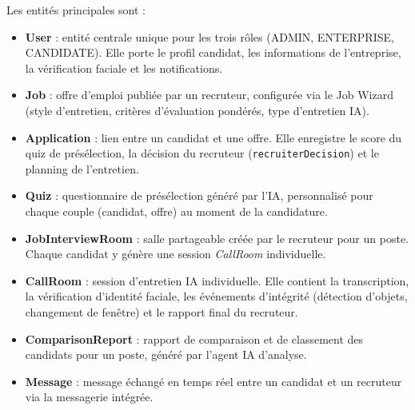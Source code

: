 Les entités principales sont :

\begin{itemize}
  \item \textbf{User} : entité centrale unique pour les trois rôles (ADMIN, ENTERPRISE,
        CANDIDATE). Elle porte le profil candidat, les informations de l'entreprise, la
        vérification faciale et les notifications.
  \item \textbf{Job} : offre d'emploi publiée par un recruteur, configurée via le Job Wizard
        (style d'entretien, critères d'évaluation pondérés, type d'entretien IA).
  \item \textbf{Application} : lien entre un candidat et une offre. Elle enregistre le score
        du quiz de présélection, la décision du recruteur (\texttt{recruiterDecision}) et le
        planning de l'entretien.
  \item \textbf{Quiz} : questionnaire de présélection généré par l'IA, personnalisé pour chaque
        couple (candidat, offre) au moment de la candidature.
  \item \textbf{JobInterviewRoom} : salle partageable créée par le recruteur pour un poste.
        Chaque candidat y génère une session \textit{CallRoom} individuelle.
  \item \textbf{CallRoom} : session d'entretien IA individuelle. Elle contient la transcription,
        la vérification d'identité faciale, les événements d'intégrité (détection d'objets,
        changement de fenêtre) et le rapport final du recruteur.
  \item \textbf{ComparisonReport} : rapport de comparaison et de classement des candidats pour
        un poste, généré par l'agent IA d'analyse.
  \item \textbf{Message} : message échangé en temps réel entre un candidat et un recruteur
        via la messagerie intégrée.
\end{itemize}

